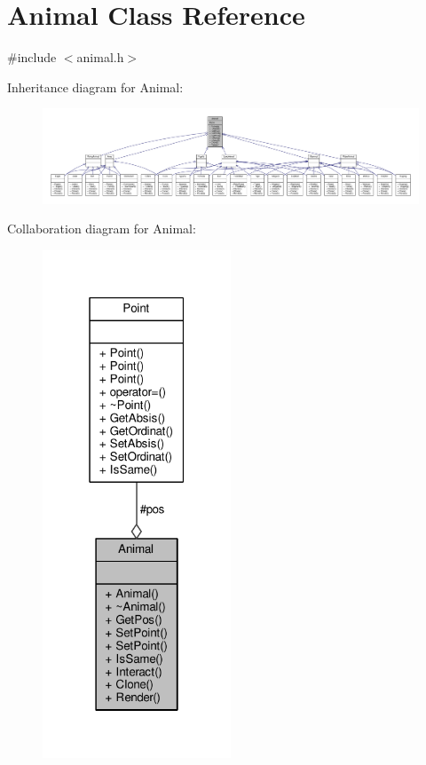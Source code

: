 \hypertarget{classAnimal}{}\section{Animal Class Reference}
\label{classAnimal}


{\ttfamily \#include $<$animal.\+h$>$}



Inheritance diagram for Animal\+:
\nopagebreak
\begin{figure}[H]
\begin{center}
\leavevmode
\includegraphics[width=350pt]{classAnimal__inherit__graph}
\end{center}
\end{figure}


Collaboration diagram for Animal\+:
\nopagebreak
\begin{figure}[H]
\begin{center}
\leavevmode
\includegraphics[width=159pt]{classAnimal__coll__graph}
\end{center}
\end{figure}
